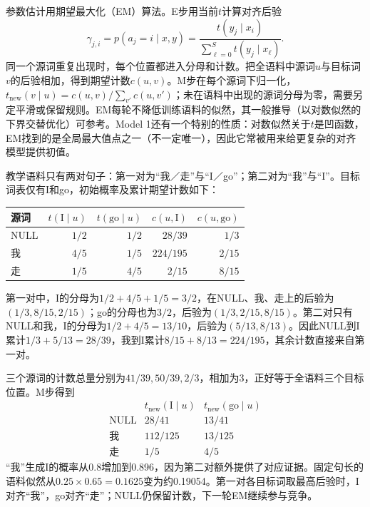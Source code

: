 参数估计用期望最大化（EM）算法。E步用当前$t$计算对齐后验
\begin{equation}
  \gamma_{j,i}
  =p(a_j=i\mid x,y)
  =\frac{t(y_j\mid x_i)}{\sum_{\ell=0}^{S}t(y_j\mid x_\ell)}.
  \label{eq:nlp-generation-ibm-posterior}
\end{equation}
同一个源词重复出现时，每个位置都进入分母和计数。把全语料中源词$u$与目标词$v$的后验相加，得到期望计数$c(u,v)$。M步在每个源词下归一化，$t_{\mathrm{new}}(v\mid u)=c(u,v)/\sum_{v'}c(u,v')$；未在语料中出现的源词分母为零，需要另定平滑或保留规则。EM每轮不降低训练语料的似然，其一般推导（以对数似然的下界交替优化）可参考。Model 1还有一个特别的性质：对数似然关于$t$是凹函数，EM找到的是全局最大值点之一（不一定唯一），因此它常被用来给更复杂的对齐模型提供初值。

\begin{example}[含空词的一轮EM]
  \label{ex:nlp-generation-em}
  教学语料只有两对句子：第一对为“我／走”与“I／go”；第二对为“我”与“I”。目标词表仅有I和go，初始概率及累计期望计数如下：
  \begin{center}
    \begin{tabular}{@{}lrrrr@{}}
      \toprule
      源词 & $t(\mathrm{I}\mid u)$ & $t(\mathrm{go}\mid u)$
        & $c(u,\mathrm{I})$ & $c(u,\mathrm{go})$\\
      \midrule
      NULL & $1/2$ & $1/2$ & $28/39$ & $1/3$\\
      我 & $4/5$ & $1/5$ & $224/195$ & $2/15$\\
      走 & $1/5$ & $4/5$ & $2/15$ & $8/15$\\
      \bottomrule
    \end{tabular}
  \end{center}
  第一对中，I的分母为$1/2+4/5+1/5=3/2$，在NULL、我、走上的后验为$(1/3,8/15,2/15)$；go的分母也为$3/2$，后验为$(1/3,2/15,8/15)$。第二对只有NULL和我，I的分母为$1/2+4/5=13/10$，后验为$(5/13,8/13)$。因此NULL到I累计$1/3+5/13=28/39$，我到I累计$8/15+8/13=224/195$，其余计数直接来自第一对。

  三个源词的计数总量分别为$41/39,50/39,2/3$，相加为3，正好等于全语料三个目标位置。M步得到
  \[
    \begin{array}{c|cc}
      &t_{\mathrm{new}}(\mathrm{I}\mid u)&t_{\mathrm{new}}(\mathrm{go}\mid u)\\
      \hline
      \mathrm{NULL}&28/41&13/41\\
      \text{我}&112/125&13/125\\
      \text{走}&1/5&4/5
    \end{array}
  \]
  “我”生成I的概率从0.8增加到0.896，因为第二对额外提供了对应证据。固定句长的语料似然从$0.25\times0.65=0.1625$变为约0.19054。第一对各目标词取最高后验时，I对齐“我”，go对齐“走”；NULL仍保留计数，下一轮EM继续参与竞争。
\end{example}

